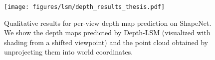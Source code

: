 \begin{figure}
\centering
\texttt{[image: figures/lsm/depth\_results\_thesis.pdf]}
\caption{Qualitative results for per-view depth map prediction on ShapeNet. We show the depth maps predicted by Depth-LSM (visualized with shading from a shifted viewpoint) and the point cloud obtained by unprojecting them into world coordinates.}
\end{figure}